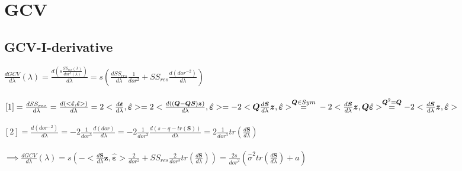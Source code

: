 \documentclass[11pt,twoside]{report}
\begin{document}
\chapter{GCV}
\section{GCV-I-derivative}
$ \frac{dGCV}{d\lambda}(\lambda) = \frac{d(s\frac{SS_{res}(\lambda)}{dor^2(\lambda)})}{d\lambda} = s (\frac{dSS_{res}}{d\lambda}\frac{1}{dor^2} + SS_{res}\frac{d(dor^{-2})}{d\lambda}) $\\
\\
$[1] = \frac{dSS_{res}}{d\lambda} = \frac{d(<\hat{\mathbold{\varepsilon}},\hat{\mathbold{\varepsilon}}> )}{d\lambda} = 2<\frac{d\hat{\mathbold{\varepsilon}}}{d\lambda},\hat{\mathbold{\varepsilon}}> = 2 < \frac{d((\mathbold{Q}-\mathbold{Q}\mathbold{S})\mathbold{z})}{d\lambda}, \hat{\mathbold{\varepsilon}}> = -2<\mathbold{Q}\frac{d\mathbold{S}}{d\lambda}\mathbold{z}, \hat{\mathbold{\varepsilon}}> \overset{\mathbold{Q}\in Sym}{=}\\ -2<\frac{d\mathbold{S}}{d\lambda}\mathbold{z},\mathbold{Q} \hat{\mathbold{\varepsilon}}> \overset{\mathbold{Q}^2 = \mathbold{Q}}{=} -2<\frac{d\mathbold{S}}{d\lambda}\mathbold{z}, \hat{\mathbold{\varepsilon}}>$\\
\\
$[2]= \frac{d(dor^{-2})}{d\lambda} = -2\frac{1}{dor^3}\frac{d(dor)}{d\lambda} = -2\frac{1}{dor^3}\frac{d(s-q-tr(\mathbold{S}))}{d\lambda} = 2\frac{1}{dor^3}tr(\frac{d\mathbold{S}}{d\lambda})$\\
\\
$\implies \frac{dGCV}{d\lambda}(\lambda) = s (-<\frac{d\mathbold{S}}{d\lambda}\mathbold{z}, \hat{\mathbold{\varepsilon}}>\frac{2}{dor^2} + SS_{res}\frac{2}{dor^3}tr(\frac{d\mathbold{S}}{d\lambda})) = \frac{2s}{{dor}^2}(\hat{\sigma}^2tr(\frac{d\mathbold{S}}{d\lambda}) + a)$
\end{document}
